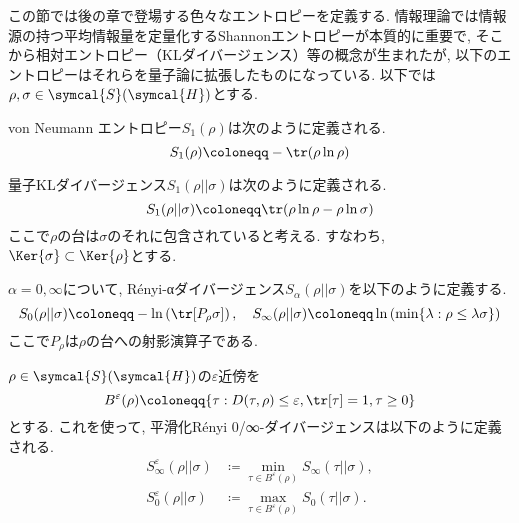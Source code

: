 
この節では後の章で登場する色々なエントロピーを定義する. 
情報理論では情報源の持つ平均情報量を定量化するShannonエントロピーが本質的に重要で, そこから相対エントロピー（KLダイバージェンス）等の概念が生まれたが, 以下のエントロピーはそれらを量子論に拡張したものになっている. 
以下では$\rho, \sigma\in\symcal{S}(\symcal{H})$とする. 



\begin{mydfn}\label{dfn.vonNeumannEntropy}
  von Neumann エントロピー$S_1(\rho)$は次のように定義される. 
  \begin{equation}
    S_1(\rho)\coloneqq -\tr(\rho\ln{\rho})
  \end{equation}
\end{mydfn}

\begin{mydfn}[量子KLダイバージェンス]\label{dfn.KLdiv}
  量子KLダイバージェンス$S_1(\rho||\sigma)$は次のように定義される. 
  \begin{equation}
    S_1(\rho||\sigma)\coloneqq \tr(\rho\ln{\rho}-\rho\ln{\sigma})
  \end{equation}
  ここで$\rho$の台は$\sigma$のそれに包含されていると考える. 
  すなわち, $\Ker{\sigma}\subset \Ker{\rho}$とする.
\end{mydfn}

\begin{mydfn}
  $\alpha=0, \infty$について, R\'{e}nyi-αダイバージェンス$S_{\alpha}(\rho||\sigma)$を以下のように定義する. 
  \begin{equation}
    S_{0}(\rho||\sigma)\coloneqq -\ln\left( \tr[P_{\rho}\sigma] \right), \quad S_{\infty}(\rho||\sigma)\coloneqq \ln\left( \min\{\lambda: \rho\leq \lambda\sigma\} \right)
  \end{equation}
  ここで$P_{\rho}$は$\rho$の台への射影演算子である. 
\end{mydfn}

\begin{mydfn}
  $\rho\in\symcal{S}(\symcal{H})$の$\varepsilon$近傍を
  \begin{equation}
    B^{\varepsilon}(\rho)\coloneqq \{\tau: D(\tau, \rho)\leq \varepsilon, \tr[\tau]=1, \tau\geq 0\}
  \end{equation}
  とする. 
  これを使って, 平滑化R\'{e}nyi 0/∞-ダイバージェンスは以下のように定義される. 
  \begin{align}
    S_{\infty}^{\varepsilon}(\rho||\sigma)&\coloneqq \min_{\tau\in B^{\varepsilon}(\rho)}S_{\infty}(\tau||\sigma), \label{dfn.smoothed_Renyi_infty_div}\\
    S_{0}^{\varepsilon}(\rho||\sigma)&\coloneqq \max_{\tau\in B^{\varepsilon}(\rho)}S_{0}(\tau||\sigma). \label{dfn.smoothed_Renyi_0_div}
  \end{align}
\end{mydfn}